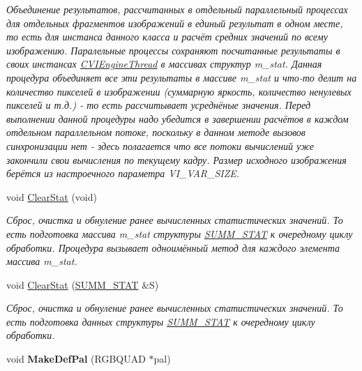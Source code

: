 \begin{DoxyCompactItemize}
$$\begin{DoxyCompactList}\small\item\em Объединение результатов, рассчитанных в отдельный параллельный процессах для отдельных фрагментов изображений в единый результат в одном месте, то есть для инстанса данного класса и расчёт средних значений по всему изображению. Паралельные процессы сохраняют посчитанные результаты в своих инстансах \hyperlink{class_c_v_i_engine_thread}{C\+V\+I\+Engine\+Thread} в массивах структур m\+\_\+stat. Данная процедура объединяет все эти результаты в массиве m\+\_\+stat и что-\/то делит на количество пикселей в изображении (суммарную яркость, количество ненулевых пикселей и т.\+д.) -\/ то есть рассчитывает усреднёные значения. Перед выполнении данной процедуры надо убедится в завершении расчётов в каждом отдельном параллельном потоке, поскольку в данном методе вызовов синхронизации нет -\/ здесь полагается что все потоки вычислений уже закончили свои вычисления по текущему кадру. Размер исходного изображения берётся из настроечного параметра V\+I\+\_\+\+V\+A\+R\+\_\+\+S\+I\+Z\+E. \end{DoxyCompactList}\item 
void \hyperlink{class_c_v_i_engine_base_a10d6138a2c8f4c4c946bf930c268be6b}{Clear\+Stat} (void)
\begin{DoxyCompactList}\small\item\em Сброс, очистка и обнуление ранее вычисленных статистических значений. То есть подготовка массива m\+\_\+stat структуры \hyperlink{class_s_u_m_m___s_t_a_t}{S\+U\+M\+M\+\_\+\+S\+T\+A\+T} к очередному циклу обработки. Процедура вызывает одноимённый метод для каждого элемента массива m\+\_\+stat. \end{DoxyCompactList}\item 
void \hyperlink{class_c_v_i_engine_base_adb910c0d7f06cf1f3ea7b2347aed1751}{Clear\+Stat} (\hyperlink{class_s_u_m_m___s_t_a_t}{S\+U\+M\+M\+\_\+\+S\+T\+A\+T} \&S)
\begin{DoxyCompactList}\small\item\em Сброс, очистка и обнуление ранее вычисленных статистических значений. То есть подготовка данных структуры \hyperlink{class_s_u_m_m___s_t_a_t}{S\+U\+M\+M\+\_\+\+S\+T\+A\+T} к очередному циклу обработки. \end{DoxyCompactList}\item 
\hypertarget{class_c_v_i_engine_base_a96dd47cc32f324e133644e7f823507ad}{void {\bfseries Make\+Def\+Pal} (R\+G\+B\+Q\+U\+A\+D $\ast$pal)}\label{class_c_v_i_engine_base_a96dd47cc32f324e133644e7f823507ad}


\end{DoxyCompactItemize}
